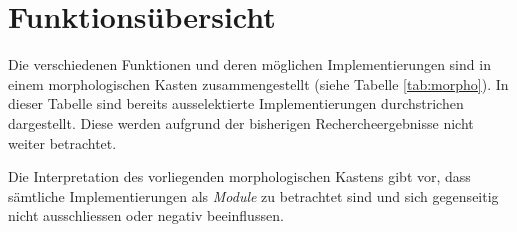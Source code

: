 \section{Funktionsübersicht}
Die verschiedenen Funktionen und deren möglichen Implementierungen sind in
einem morphologischen Kasten zusammengestellt (siehe Tabelle 
\ref{tab:morpho}). In dieser Tabelle sind bereits ausselektierte 
Implementierungen durchstrichen dargestellt. Diese werden aufgrund der
bisherigen Rechercheergebnisse nicht weiter betrachtet.

Die Interpretation des vorliegenden morphologischen Kastens gibt vor, dass
sämtliche Implementierungen als \emph{Module} zu betrachtet sind und sich
gegenseitig nicht ausschliessen oder negativ beeinflussen.






















